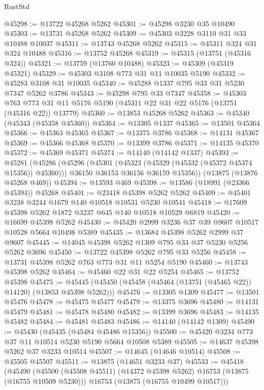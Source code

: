 \begin{lexlean}{RustStd}
\begin{coremodule}
@45298 := @13722 @45268 @5262
@45301 := @45298 @3230 @35 @10490
@45303 := @13731 @45268 @5262
@45309 := @45303 @3228 @3110 @31 @33 @10488 @10037
@45311 := @13743 @45268 @5262
@45315 := @45311 @324 @31 @324 @10488
@45316 := @13752 @45268
@45319 := @45315 (@13751 (@45316 @324))
@45321 := @13759 (@13760 @10488)
@45323 := @45309 (@45319 @45321)
@45329 := @45303 @3108 @773 @31 @11 @10035 @5190
@45332 := @45283 @3108 @31 @10035
@45340 := @45288 @1337 @795 @33 @31 @5230 @7347 @5262 @3786
@45343 := @45298 @795 @33 @7347
@45358 := @45303
    @763
    @773
    @31
    @11
    @5176
    @5190
    (@45311 @22 @31 @22 @5176 (@13751 (@45316 @22)) @13779)
@45360 := @13853 @45268 @5262
@45363 := @45340 (@45343 (@45358 @45360))
@45364 := @13305 @1337
@45365 := @13501 @45364
@45366 := @45363 @45365
@45367 := @13375 @3786
@45368 := @14131 @45367
@45369 := @45366 @45368
@45370 := @13399 @3786
@45371 := @14135 @45370
@45372 := @45369 @45371
@45374 := @14140 (@14142 @1337)
@45393 := @45281
    (@45286
      (@45296
        (@45301 (@45323 (@45329 (@45332 (@45372 @45374 @15356)) @45360)))
        @36150
        @36153
        @36156
        @36159
        @15356))
    (@13875 (@13876 @45268 @469))
@45394 := @13593 @469
@45398 := @13586 (@18991 (@23366 @45394)) @45268
@45401 := @23418 @45398 @5262 @5262
@45409 := @45401 @3238 @3244 @1679 @140 @10518 @10531 @5230 @10541
@45418 := @17609 @45398 @5262 @1872 @3237 @645 @140 @10518 @10529 @6819
@45420 := @16699 @45398 @5262
@45430 := @45420 @2999 @3236 @37 @39 @9607 @10517 @10528 @5664 @10498 @5389
@45435 := @13684 @45398 @5262 @2999 @37 @9607
@45445 := @14045 @45398 @5262 @1309 @795 @33 @37 @5230 @5256 @5262 @3696
@45450 := @13722 @45398 @5262 @795 @33 @5256
@45458 := @13731 @45398 @5262 @763 @773 @31 @11 @5254 @5190
@45460 := @13743 @45398 @5262
@45464 := @45460 @22 @31 @22 @5254
@45465 := @13752 @45398
@45475 := @45445 (@45450 (@45458 (@45464 (@13751 (@45465 @22)) @14120) (@13853 @45398 @5262)))
@45476 := @13305 @1309
@45477 := @13501 @45476
@45478 := @45475 @45477
@45479 := @13375 @3696
@45480 := @14131 @45479
@45481 := @45478 @45480
@45482 := @13399 @3696
@45483 := @14135 @45482
@45484 := @45481 @45483
@45486 := @14140 (@14142 @1309)
@45490 := @45430 (@45435 (@45484 @45486 @15356))
@45500 := @45420 @3234 @773 @37 @11 @10514 @5230 @5190 @5664 @10508 @5389
@45505 := @14637 @45398 @5262 @37 @3233 @10514
@45507 := @14645 (@14646 @10514)
@45508 := @45505 @45507
@45511 := @13875 (@14651 @3233 @37)
@45533 := @45418
    (@45490
      (@45500 (@45508 @45511) (@14372 @45398 @5262) @16753 (@13875 (@16755 @10509 @5230)))
      @16753
      (@13875 (@16755 @10499 @10517)))

\end{coremodule}
\end{lexlean}
